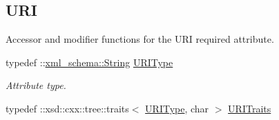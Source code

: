 \subsection*{URI}
\label{_amgrp8447306210a0972ac94b7d774799df1a}
Accessor and modifier functions for the URI required attribute. \begin{DoxyCompactItemize}
\item 
\hypertarget{classopenstack_1_1xml_1_1RateLimit_af7901803e96cb338e2560358c8ce931b}{
typedef ::\hyperlink{namespacexml__schema_af6757b5701ccc893f3b551bd70e0c94d}{xml\_\-schema::String} \hyperlink{classopenstack_1_1xml_1_1RateLimit_af7901803e96cb338e2560358c8ce931b}{URIType}}
\label{classopenstack_1_1xml_1_1RateLimit_af7901803e96cb338e2560358c8ce931b}

\begin{DoxyCompactList}\small\item\em Attribute type. \item\end{DoxyCompactList}\item 
\hypertarget{classopenstack_1_1xml_1_1RateLimit_a36ad34b35f2a5a4fafd7610a29fccb40}{
typedef ::xsd::cxx::tree::traits$<$ \hyperlink{classopenstack_1_1xml_1_1RateLimit_af7901803e96cb338e2560358c8ce931b}{URIType}, char $>$ \hyperlink{classopenstack_1_1xml_1_1RateLimit_a36ad34b35f2a5a4fafd7610a29fccb40}{URITraits}}
\label{classopenstack_1_1xml_1_1RateLimit_a36ad34b35f2a5a4fafd7610a29fccb40}


\end{DoxyCompactItemize}
